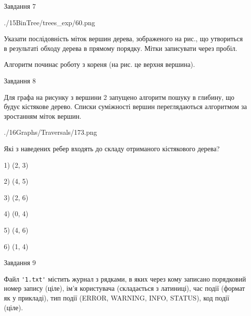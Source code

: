 \documentclass[12pt, ukrainian]{article}
\def\code#1{\Verb!#1!}
\begin{document}
{\vspace{10mm}\par

\newpage
\begin{minipage}[t]{9.7cm}
               
{\begin{center}Завдання {7}\end{center}}
\vspace{-6mm}

\begin{center}
	{./15BinTree/trees_exp/60.png}
\end{center}
Указати послідовність міток вершин дерева, зображеного на рис., що утвориться в результаті обходу дерева в прямому порядку. Мітки записувати через пробіл.\par Алгоритм починає роботу з кореня (на рис. це верхня вершина).\par

\end{minipage}
\vline \hspace{8mm}
\begin{minipage}[t]{8.0cm}
               
{\begin{center}Завдання {8}\end{center}}
\vspace{-6mm}
Для графа на рисунку з вершини 2 запущено алгоритм пошуку в глибину, що будує кістякове дерево. Списки суміжності вершин переглядаються алгоритмом за зростанням міток вершин.\par
\begin{center}
	{./16Graphs/Traversals/173.png}
\end{center}
\par Які з наведених ребер входять до складу отриманого кістякового дерева?\par
1) (2, 3)\par
2) (4, 5)\par
3) (2, 6)\par
4) (0, 4)\par
5) (4, 6)\par
6) (1, 4)\par
{\vskip 15pt} \par

\end{minipage}

               
{\begin{center}Завдання {9}\end{center}}
\vspace{-6mm}
Файл \code{'1.txt'} містить журнал з рядками, в яких через кому записано поряд\-ко\-вий номер запису (ціле), ім'я користувача (складається з латиниці), час події (фор\-мат як у прикладі), тип події (ERROR, WARNING, INFO, STATUS), код події (ціле).

}
\end{document}
